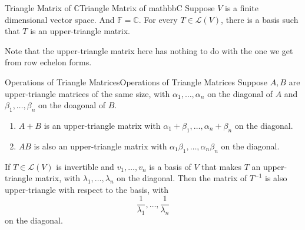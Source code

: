 \documentclass[../main.tex]{subfiles}
\begin{document}
\begin{corollary}{Triangle Matrix of $\mathbb{C}$}{Triangle Matrix of mathbbC}
Suppose $V$ is a finite dimensional vector space. And $\mathbb{F}=\mathbb{C}$. For every $T\in \mathscr{L}(V)$, there is a basis such that $T$ is an  upper-triangle matrix.
\end{corollary}
\begin{remark}
Note that the upper-triangle matrix here has nothing to do with the one we get from row echelon forms.
\end{remark}

\begin{proposition}{Operations of Triangle Matrices}{Operations of Triangle Matrices}
Suppose $A,B$ are upper-triangle matrices of the same size, with $\alpha_1, \ldots ,\alpha_n$ on the diagonal of $A$ and $\beta_1, \ldots ,\beta_n$ on the doagonal of $B$.
\begin{enumerate}
	\item $A+B$ is an upper-triangle matrix with $\alpha_1+\beta_1, \ldots ,\alpha_n+\beta_n$ on the diagonal.
	\item $AB$ is also an upper-triangle matrix with $\alpha_1 \beta_1, \ldots ,\alpha_n \beta_n$ on the diagonal.
\end{enumerate}

If $T\in \mathscr{L}(V)$ is invertible and  $v_1, \ldots ,v_n$ is a basis of $V$ that makes $T$ an upper-triangle matrix, with $\lambda_1, \ldots ,\lambda_n$ on the diagonal. Then the matrix of  $T^{-1}$ is also upper-triangle with respect to the basis, with
\begin{equation*}
\frac{1}{\lambda_1}, \ldots ,\frac{1}{\lambda_n}
\end{equation*}
on the diagonal.
\end{proposition}
\end{document}
